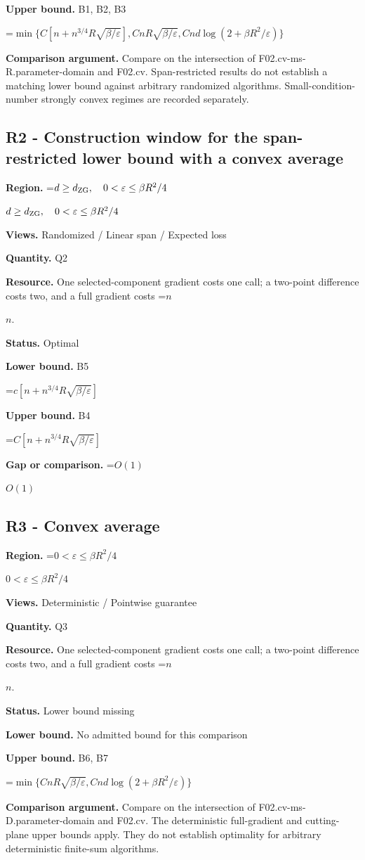 \documentclass[10pt,a4paper]{article}
\newcommand{\AtlasMath}[1]{\par\begingroup\centering\setbox0=\hbox{$\displaystyle #1$}\ifdim\wd0>1.4\linewidth\typeout{ATLAS WIDE FORMULA: \the\wd0}\fi\ifdim\wd0>\linewidth\resizebox{\linewidth}{!}{\box0}\else\box0\fi\par\endgroup}
\newcommand{\AtlasInlineMath}[1]{\begingroup\setbox0=\hbox{$#1$}\ifdim\wd0>.4\linewidth\endgroup\AtlasMath{#1}\else\endgroup$#1$\fi}
\begin{document}
\textbf{Upper bound.} B1, B2, B3

\AtlasMath{\min\{C[n+n^{3/4}R\sqrt{\beta/\varepsilon}],CnR\sqrt{\beta/\varepsilon},Cnd\log(2+\beta R^2/\varepsilon)\}}
\textbf{Comparison argument.} Compare on the intersection of F02.cv-ms-R.parameter-domain and F02.cv. Span-restricted results do not establish a matching lower bound against arbitrary randomized algorithms. Small-condition-number strongly convex regimes are recorded separately.

\subsection{R2 - Construction window for the span-restricted lower bound with a convex average}
\textbf{Region.} \AtlasInlineMath{d\ge d_{\rm ZG},\quad0<\varepsilon\le\beta R^2/4}

\textbf{Views.} Randomized / Linear span / Expected loss

\textbf{Quantity.} Q2

\textbf{Resource.} One selected-component gradient costs one call; a two-point difference costs two, and a full gradient costs \AtlasInlineMath{n}.

\textbf{Status.} Optimal

\textbf{Lower bound.} B5

\AtlasMath{c[n+n^{3/4}R\sqrt{\beta/\varepsilon}]}
\textbf{Upper bound.} B4

\AtlasMath{C[n+n^{3/4}R\sqrt{\beta/\varepsilon}]}
\textbf{Gap or comparison.} \AtlasInlineMath{O(1)}

\subsection{R3 - Convex average}
\textbf{Region.} \AtlasInlineMath{0<\varepsilon\le\beta R^2/4}

\textbf{Views.} Deterministic / Pointwise guarantee

\textbf{Quantity.} Q3

\textbf{Resource.} One selected-component gradient costs one call; a two-point difference costs two, and a full gradient costs \AtlasInlineMath{n}.

\textbf{Status.} Lower bound missing

\textbf{Lower bound.} No admitted bound for this comparison

\textbf{Upper bound.} B6, B7

\AtlasMath{\min\{CnR\sqrt{\beta/\varepsilon},Cnd\log(2+\beta R^2/\varepsilon)\}}
\textbf{Comparison argument.} Compare on the intersection of F02.cv-ms-D.parameter-domain and F02.cv. The deterministic full-gradient and cutting-plane upper bounds apply. They do not establish optimality for arbitrary deterministic finite-sum algorithms.
\end{document}
